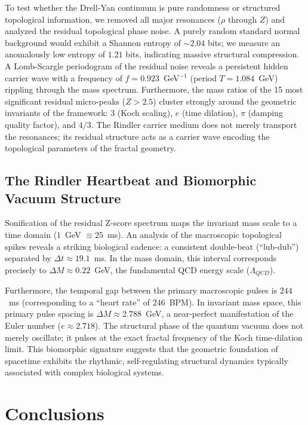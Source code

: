 \documentclass[twocolumn,showpacs,preprintnumbers,amsmath,amssymb,prl]{revtex4-2}
\begin{document}
To test whether the Drell-Yan continuum is pure randomness or structured topological information, we removed all major resonances ($\rho$ through $Z$) and analyzed the residual topological phase noise. A purely random standard normal background would exhibit a Shannon entropy of $\sim 2.04$ bits; we measure an anomalously low entropy of $1.21$ bits, indicating massive structural compression.
A Lomb-Scargle periodogram of the residual noise reveals a persistent hidden carrier wave with a frequency of $f = 0.923$~GeV$^{-1}$ (period $T = 1.084$~GeV) rippling through the mass spectrum. Furthermore, the mass ratios of the 15 most significant residual micro-peaks ($Z > 2.5$) cluster strongly around the geometric invariants of the framework: $3$ (Koch scaling), $e$ (time dilation), $\pi$ (damping quality factor), and $4/3$. The Rindler carrier medium does not merely transport the resonances; its residual structure acts as a carrier wave encoding the topological parameters of the fractal geometry.

\subsection{The Rindler Heartbeat and Biomorphic Vacuum Structure}

Sonification of the residual Z-score spectrum maps the invariant mass scale to a time domain ($1$~GeV $\equiv 25$~ms). An analysis of the macroscopic topological spikes reveals a striking biological cadence: a consistent double-beat (``lub-dub'') separated by $\Delta t \approx 19.1$~ms. In the mass domain, this interval corresponds precisely to $\Delta M \approx 0.22$~GeV, the fundamental QCD energy scale ($\Lambda_{QCD}$). 

Furthermore, the temporal gap between the primary macroscopic pulses is $244$~ms (corresponding to a ``heart rate'' of $246$~BPM). In invariant mass space, this primary pulse spacing is $\Delta M \approx 2.788$~GeV, a near-perfect manifestation of the Euler number ($e \approx 2.718$). The structural phase of the quantum vacuum does not merely oscillate; it pulses at the exact fractal frequency of the Koch time-dilation limit. This biomorphic signature suggests that the geometric foundation of spacetime exhibits the rhythmic, self-regulating structural dynamics typically associated with complex biological systems.

\section{Conclusions}
\end{document}
